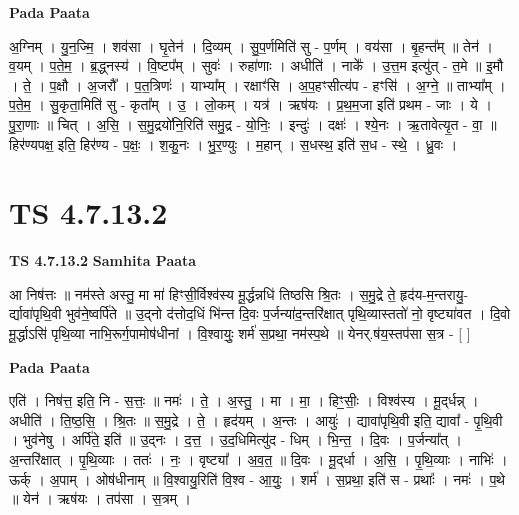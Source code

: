 \documentclass[17pt]{extarticle}
\begin{document}
\textbf{Pada Paata} \newline

अ॒ग्निम् । यु॒न॒ज्मि॒ । शव॑सा । घृ॒तेन॑ । दि॒व्यम् । सु॒प॒र्णमिति॑ सु - प॒र्णम् । वय॑सा । बृ॒हन्त᳚म् ॥ तेन॑ । व॒यम् । प॒ते॒म॒ । ब्र॒द्ध्नस्य॑ । वि॒ष्टप᳚म् । सुवः॑ । रुहा॑णाः । अधीति॑ । नाके᳚ । उ॒त्त॒म इत्यु॑त् - त॒मे ॥ इ॒मौ । ते॒ । प॒क्षौ । अ॒जरौ᳚ । प॒त॒त्रिणः॑ । याभ्या᳚म् । रक्षाꣳ॑सि । अ॒प॒हꣳसीत्य॑प - हꣳसि॑ । अ॒ग्ने॒ ॥ ताभ्या᳚म् । प॒ते॒म॒ । सु॒कृता॒मिति॑ सु - कृता᳚म् । उ॒ । लो॒कम् । यत्र॑ । ऋष॑यः । प्र॒थ॒म॒जा इति॑ प्रथम - जाः । ये । पु॒रा॒णाः ॥ चित् । अ॒सि॒ । स॒मु॒द्रयो॑नि॒रिति॑ समु॒द्र - यो॒निः॒ । इन्दुः॑ । दक्षः॑ । श्ये॒नः । ऋ॒तावेत्यृ॒त - वा॒ ॥ हिर॑ण्यपक्ष॒ इति॒ हिर॑ण्य - प॒क्षः॒ । श॒कु॒नः । भु॒र॒ण्युः । म॒हान् । स॒धस्थ॒ इति॑ स॒ध - स्थे॒ । ध्रु॒वः ।  \newline





\section{ TS 4.7.13.2 }

\textbf{TS 4.7.13.2 } \newline
\textbf{Samhita Paata} \newline

आ निष॑त्तः ॥ नम॑स्ते अस्तु॒ मा मा॑ हिꣳसी॒र्विश्व॑स्य मू॒र्द्धन्नधि॑ तिष्ठसि श्रि॒तः । स॒मु॒द्रे ते॒ हृद॑य-म॒न्तरायु॒-र्द्यावा॑पृथि॒वी भुव॑ने॒ष्वर्पि॑ते ॥ उ॒द्नो द॑त्तोद॒धिं भि॑न्त्त दि॒वः प॒र्जन्या॑द॒न्तरि॑क्षात् पृथि॒व्यास्ततो॑ नो॒ वृष्ट्या॑वत । दि॒वो मू॒र्द्धाऽसि॑ पृथि॒व्या नाभि॒रूर्ग॒पामोष॑धीनां । वि॒श्वायुः॒ शर्म॑ स॒प्रथा॒ नम॑स्प॒थे ॥ येनर्.ष॑य॒स्तप॑सा स॒त्र - [  ] \newline

\textbf{Pada Paata} \newline

एति॑ । निष॑त्त॒ इति॒ नि - स॒त्तः॒ ॥ नमः॑ । ते॒ । अ॒स्तु॒ । मा । मा॒ । हिꣳ॒॒सीः॒ । विश्व॑स्य । मू॒द्‌र्धन्न् । अधीति॑ । ति॒ष्ठ॒सि॒ । श्रि॒तः ॥ स॒मु॒द्रे । ते॒ । हृद॑यम् । अ॒न्तः । आयुः॑ । द्यावा॑पृथि॒वी इति॒ द्यावा᳚ - पृ॒थि॒वी । भुव॑नेषु । अर्पि॑ते॒ इति॑ ॥ उ॒द्नः । द॒त्त॒ । उ॒द॒धिमित्यु॑द - धिम् । भि॒न्त॒ । दि॒वः । प॒र्जन्या᳚त् । अ॒न्तरि॑क्षात् । पृ॒थि॒व्याः । ततः॑ । नः॒ । वृष्ट्या᳚ । अ॒व॒त॒ ॥ दि॒वः । मू॒द्‌र्धा । अ॒सि॒ । पृ॒थि॒व्याः । नाभिः॑ । ऊर्क् । अ॒पाम् । ओष॑धीनाम् ॥ वि॒श्वायु॒रिति॑ वि॒श्व - आ॒युः॒ । शर्म॑ । स॒प्रथा॒ इति॑ स - प्रथाः᳚ । नमः॑ । प॒थे ॥ येन॑ । ऋष॑यः । तप॑सा । स॒त्रम् ।  \newline
\end{document}
